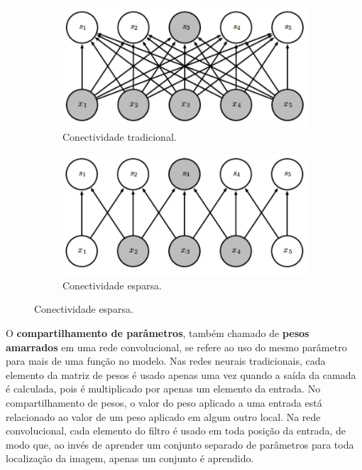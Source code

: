 \begin{figure}[htp]
\begin{subfigure}{.5\textwidth}
  \centering
  \includegraphics[width=.9\linewidth]{fig/full}
  \caption{Conectividade tradicional.}
  \label{fig:full}
\end{subfigure}%
\begin{subfigure}{.5\textwidth}
  \centering
  \includegraphics[width=.9\linewidth]{fig/sparse}
  \caption{Conectividade esparsa.}
  \label{fig:sparse}
\end{subfigure}
\end{figure}

O \textbf{compartilhamento de parâmetros}, também chamado de \textbf{pesos amarrados} 
em uma rede convolucional, se refere ao uso do mesmo parâmetro para mais de uma função no modelo.
Nas redes neurais tradicionais, cada elemento da matriz de pesos é usado apenas uma vez quando a
saída da camada é calculada, pois é multiplicado por apenas um elemento da entrada. No compartilhamento
de pesos, o valor do peso aplicado a uma entrada está relacionado ao valor de um peso aplicado em
algum outro local. Na rede convolucional, cada elemento do filtro é usado em toda posição da entrada,
de modo que, ao invés de aprender um conjunto separado de parâmetros para toda localização da imagem, apenas
um conjunto é aprendido.

